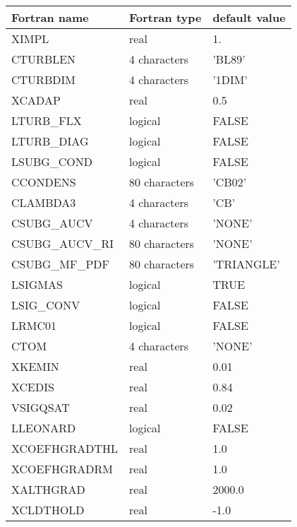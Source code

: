 \begin{longtable} {|p{}|p{}|p{}|}
\hline
Fortran name &  Fortran type & default value \\
\hline 
\endhead
\hline
\endfoot
XIMPL       &  real          & 1.     \\
CTURBLEN    &  4 characters  & 'BL89'   \\
CTURBDIM    &  4 characters  & '1DIM'   \\
XCADAP      & real           & 0.5 \\
LTURB\_FLX  &  logical       & FALSE  \\
LTURB\_DIAG &  logical       & FALSE  \\
LSUBG\_COND &  logical       & FALSE  \\
CCONDENS    &  80 characters  & 'CB02' \\
CLAMBDA3    &  4 characters  & 'CB' \\
CSUBG\_AUCV &  4 characters  & 'NONE' \\
CSUBG\_AUCV\_RI &  80 characters  & 'NONE' \\
CSUBG\_MF\_PDF  &  80 characters  & 'TRIANGLE' \\
LSIGMAS     &  logical       & TRUE   \\
LSIG\_CONV  &  logical       & FALSE   \\
LRMC01      &  logical       & FALSE  \\
CTOM        &  4 characters  & 'NONE'   \\
XKEMIN      &  real          & 0.01 \\
XCEDIS      &  real          & 0.84 \\
VSIGQSAT    & real           & 0.02 \\
LLEONARD      & logical        & FALSE \\
XCOEFHGRADTHL & real         & 1.0   \\
XCOEFHGRADRM  & real         & 1.0   \\
XALTHGRAD     & real         & 2000.0 \\
XCLDTHOLD     & real         & -1.0   \\
\end{longtable}


